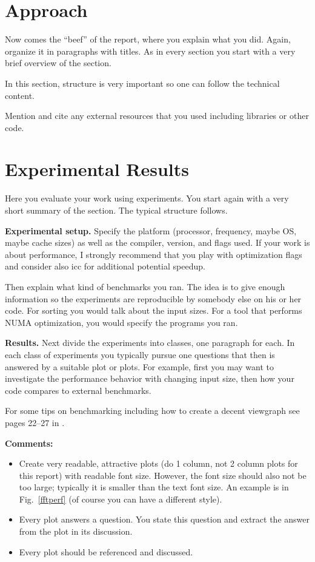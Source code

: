 \documentclass[letterpaper]{article}
\newcommand{\mypar}[1]{{\bf #1.}}
\begin{document}
\section{Approach}
\label{sec:approach}

Now comes the ``beef'' of the report, where you explain what you
did. Again, organize it in paragraphs with titles. As in every section
you start with a very brief overview of the section.

In this section, structure is very important so one can follow the technical content.

Mention and cite any external resources that you used including libraries or other code.

\section{Experimental Results}\label{sec:exp}

Here you evaluate your work using experiments. You start again with a
very short summary of the section. The typical structure follows.

\mypar{Experimental setup} Specify the platform (processor, frequency, maybe OS, maybe cache sizes)
as well as the compiler, version, and flags used. If your work is about performance, 
I strongly recommend that you play with optimization flags and consider also icc for additional potential speedup.

Then explain what kind of benchmarks you ran. The idea is to give enough information so the experiments are reproducible by somebody else on his or her code.
For sorting you would talk about the input sizes. For a tool that performs NUMA optimization, you would specify the programs you ran.

\mypar{Results}
Next divide the experiments into classes, one paragraph for each. In each class of experiments you typically pursue one questions that then is answered by a suitable plot or plots. For example, first you may want to investigate the performance behavior with changing input size, then how your code compares to external benchmarks.

For some tips on benchmarking including how to create a decent viewgraph see pages 22--27 in \cite{Pueschel:10}.

{\bf Comments:}
\begin{itemize}
\item Create very readable, attractive plots (do 1 column, not 2 column plots
for this report) with readable font size. However, the font size should also not be too large; typically it is smaller than the text font size.
An example is in Fig.~\ref{fftperf} (of course you can have a different style).
\item Every plot answers a question. You state this question and extract the
answer from the plot in its discussion.
\item Every plot should be referenced and discussed.
\end{itemize}
\end{document}
